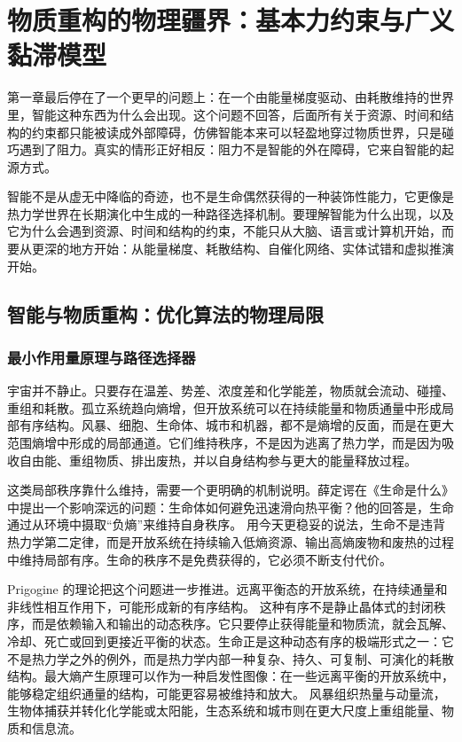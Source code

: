 \chapter{物质重构的物理疆界：基本力约束与广义黏滞模型}

第一章最后停在了一个更早的问题上：在一个由能量梯度驱动、由耗散维持的世界里，智能这种东西为什么会出现。这个问题不回答，后面所有关于资源、时间和结构的约束都只能被读成外部障碍，仿佛智能本来可以轻盈地穿过物质世界，只是碰巧遇到了阻力。真实的情形正好相反：阻力不是智能的外在障碍，它来自智能的起源方式。

智能不是从虚无中降临的奇迹，也不是生命偶然获得的一种装饰性能力，它更像是热力学世界在长期演化中生成的一种路径选择机制。要理解智能为什么出现，以及它为什么会遇到资源、时间和结构的约束，不能只从大脑、语言或计算机开始，而要从更深的地方开始：从能量梯度、耗散结构、自催化网络、实体试错和虚拟推演开始。

\section{智能与物质重构：优化算法的物理局限}

\subsection{最小作用量原理与路径选择器}


宇宙并不静止。只要存在温差、势差、浓度差和化学能差，物质就会流动、碰撞、重组和耗散。孤立系统趋向熵增，但开放系统可以在持续能量和物质通量中形成局部有序结构。风暴、细胞、生命体、城市和机器，都不是熵增的反面，而是在更大范围熵增中形成的局部通道。它们维持秩序，不是因为逃离了热力学，而是因为吸收自由能、重组物质、排出废热，并以自身结构参与更大的能量释放过程。

这类局部秩序靠什么维持，需要一个更明确的机制说明。薛定谔在《生命是什么》中提出一个影响深远的问题：生命体如何避免迅速滑向热平衡？他的回答是，生命通过从环境中摄取“负熵”来维持自身秩序。\cite{schrodinger1944} 用今天更稳妥的说法，生命不是违背热力学第二定律，而是开放系统在持续输入低熵资源、输出高熵废物和废热的过程中维持局部有序。生命的秩序不是免费获得的，它必须不断支付代价。

Prigogine 的理论把这个问题进一步推进。远离平衡态的开放系统，在持续通量和非线性相互作用下，可能形成新的有序结构。\cite{prigogine1977nobel,nicolis1977} 这种有序不是静止晶体式的封闭秩序，而是依赖输入和输出的动态秩序。它只要停止获得能量和物质流，就会瓦解、冷却、死亡或回到更接近平衡的状态。生命正是这种动态有序的极端形式之一：它不是热力学之外的例外，而是热力学内部一种复杂、持久、可复制、可演化的耗散结构。最大熵产生原理可以作为一种启发性图像：在一些远离平衡的开放系统中，能够稳定组织通量的结构，可能更容易被维持和放大。\cite{martyushev2006} 风暴组织热量与动量流，生物体捕获并转化化学能或太阳能，生态系统和城市则在更大尺度上重组能量、物质和信息流。

